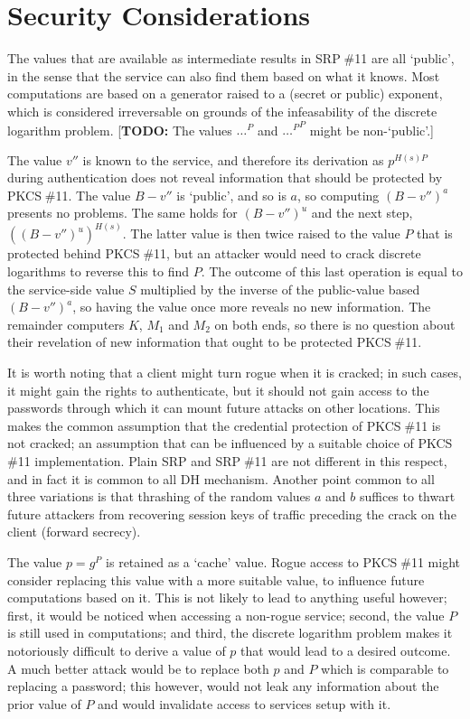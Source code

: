 \documentclass[a4paper,11pt]{article}
\def\pkcs11{PKCS$\;$\#11\xspace}
\def\srp11{SRP$\;$\#11\xspace}
\begin{document}
\section{Security Considerations}

The values that are available as intermediate results in \srp11 are all `public', in the sense that the service can also find them based on what it knows.  Most computations are based on a generator raised to a (secret or public) exponent, which is considered irreversable on grounds of the infeasability of the discrete logarithm problem.  [\textbf{TODO:} The values $\ldots^P$ and ${\ldots^P}^P$ might be non-`public'.]

The value $v''$ is known to the service, and therefore its derivation as $p^{H(s)P}$ during authentication does not reveal information that should be protected by \pkcs11.  The value $B-v''$ is `public', and so is $a$, so computing $(B-v'')^a$ presents no problems.  The same holds for $(B-v'')^u$ and the next step, $((B-v'')^u)^{H(s)}$.  The latter value is then twice raised to the value $P$ that is protected behind \pkcs11, but an attacker would need to crack discrete logarithms to reverse this to find $P$.  The outcome of this last operation is equal to the service-side value $S$ multiplied by the inverse of the public-value based $(B-v'')^a$, so having the value once more reveals no new information.  The remainder computers $K$, $M_1$ and $M_2$ on both ends, so there is no question about their revelation of new information that ought to be protected \pkcs11.

It is worth noting that a client might turn rogue when it is cracked; in such cases, it might gain the rights to authenticate, but it should not gain access to the passwords through which it can mount future attacks on other locations.  This makes the common assumption that the credential protection of \pkcs11 is not cracked; an assumption that can be influenced by a suitable choice of \pkcs11 implementation.  Plain SRP and \srp11 are not different in this respect, and in fact it is common to all DH mechanism.  Another point common to all three variations is that thrashing of the random values $a$ and $b$ suffices to thwart future attackers from recovering session keys of traffic preceding the crack on the client (forward secrecy).

The value $p=g^P$ is retained as a `cache' value.  Rogue access to \pkcs11 might consider replacing this value with a more suitable value, to influence future computations based on it.  This is not likely to lead to anything useful however; first, it would be noticed when accessing a non-rogue service; second, the value $P$ is still used in computations; and third, the discrete logarithm problem makes it notoriously difficult to derive a value of $p$ that would lead to a desired outcome.  A much better attack would be to replace both $p$ and $P$ which is comparable to replacing a password; this however, would not leak any information about the prior value of $P$ and would invalidate access to services setup with it.
\end{document}

